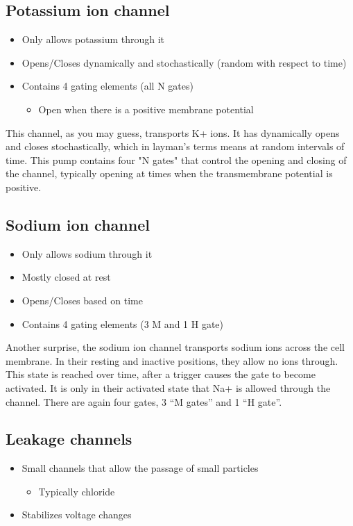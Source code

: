 \documentclass[11pt]{book}
\begin{document}
\subsection{Potassium ion channel}
\begin{itemize}
	\item Only allows potassium through it
	\item Opens/Closes dynamically and stochastically (random with respect to time)
	\item Contains 4 gating elements (all N gates)
	\begin {itemize}
		\item Open when there is a positive membrane potential
	\end {itemize}
\end{itemize}

This channel, as you may guess, transports K+ ions. It has dynamically opens and closes stochastically, which in layman's terms means at random intervals of time. This pump contains four "N gates" that control the opening and closing of the channel, typically opening at times when the transmembrane potential is positive. 

\subsection{Sodium ion channel}
\begin{itemize}
	\item Only allows sodium through it
	\item Mostly closed at rest
	\item Opens/Closes based on time
	\item Contains 4 gating elements (3 M and 1 H gate)
\end{itemize}

Another surprise, the sodium ion channel transports sodium ions across the cell membrane. In their resting and inactive positions, they allow no ions through. This state is reached over time, after a trigger causes the gate to become activated. It is only in their activated state that Na+ is allowed through the channel. There are again four gates, 3 ``M gates'' and 1 ``H gate''. 

\subsection{Leakage channels}
\begin{itemize}
	\item Small channels that allow the passage of small particles
	\begin{itemize}
		\item Typically chloride
	\end{itemize}
	\item Stabilizes voltage changes
\end{itemize}
\end{document}
